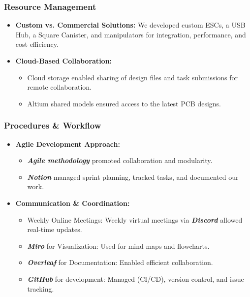 \subsubsection{Resource Management}

\vspace{-0.3\baselineskip}
\begin{itemize}[leftmargin=0pt, itemindent=20pt]
    \setlength{\itemsep}{0pt}
    \item \textbf{Custom vs. Commercial Solutions:} We developed custom ESCs, a USB Hub, a Square Canister, and manipulators for integration, performance, and cost efficiency.
    \item \textbf{Cloud-Based Collaboration:}
    \vspace{-0.5\baselineskip}
    \begin{itemize}
        \setlength{\itemsep}{0pt}
        \item Cloud storage enabled sharing of design files and task submissions for remote collaboration.
        \item Altium shared models ensured access to the latest PCB designs.
    \end{itemize}
\end{itemize}

\subsubsection{Procedures \& Workflow}

\vspace{-0.3\baselineskip}
\begin{itemize}[leftmargin=0pt, itemindent=20pt]
    \setlength{\itemsep}{0pt}
    \item \textbf{Agile Development Approach:}
    \vspace{-0.5\baselineskip}
    \begin{itemize}[leftmargin=35pt, itemindent=0pt]
        \setlength{\itemsep}{0pt}
        \item \textbf{\textit{Agile methodology}} promoted collaboration and modularity.
        \item \textbf{\textit{Notion}} managed sprint planning, tracked tasks, and documented our work.
    \end{itemize}
    \item \textbf{Communication \& Coordination:}
    \vspace{-0.5\baselineskip}
    \begin{itemize}[leftmargin=35pt, itemindent=0pt]
        \setlength{\itemsep}{0pt}
        \item Weekly Online Meetings: Weekly virtual meetings via \textbf{\textit{Discord}} allowed real-time updates.
        \item \textbf{\textit{Miro}} for Visualization: Used for mind maps and flowcharts. 
        \item \textbf{\textit{Overleaf}} for Documentation: Enabled efficient collaboration.
        \item \textbf{\textit{GitHub}} for development: Managed (CI/CD), version control, and issue tracking.
    \end{itemize}
\end{itemize}

